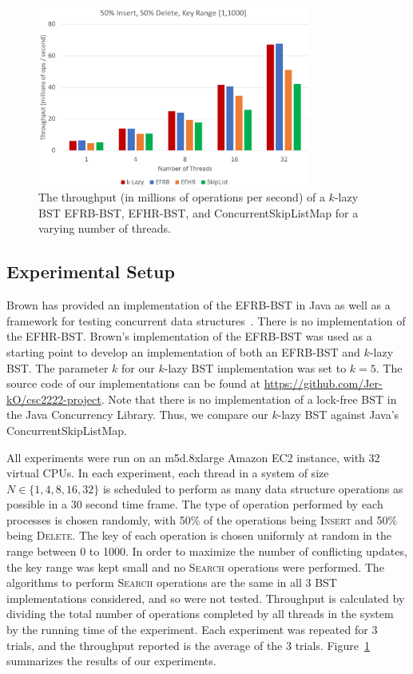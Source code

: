 \documentclass[letterpaper,twocolumn]{article}
\begin{document}
\begin{figure}[!tb]
	\centering
	\includegraphics[width=0.80\textwidth]{results.png} 
	\caption{The throughput (in millions of operations per second) of a $k$-lazy BST EFRB-BST, EFHR-BST, and ConcurrentSkipListMap for a varying number of threads.}
	\label{results}
\end{figure}


\subsection{Experimental Setup}
Brown has provided an implementation of the EFRB-BST in Java as well as a framework for testing concurrent data structures~\cite{BrownImpl19}. There is no implementation of the EFHR-BST. Brown's implementation of the EFRB-BST was used as a starting point to develop an implementation of both an EFRB-BST and $k$-lazy BST. The parameter $k$ for our $k$-lazy BST implementation was set to $k = 5$. The source code of our implementations can be found at \url{https://github.com/Jer-kO/csc2222-project}. Note that there is no implementation of a lock-free BST in the Java Concurrency Library. Thus, we compare our $k$-lazy BST against Java's ConcurrentSkipListMap.

All experiments were run on an m5d.8xlarge Amazon EC2 instance, with 32 virtual CPUs. In each experiment, each thread in a system of size $N \in  \{1, 4, 8, 16, 32\}$ is scheduled to perform as many data structure operations as possible in a 30 second time frame. The type of operation performed by each processes is chosen randomly, with 50\% of the operations being \textsc{Insert} and 50\% being \textsc{Delete}. The key of each operation is chosen uniformly at random in the range between 0 to 1000. In order to maximize the number of conflicting updates, the key range was kept small and no \textsc{Search} operations were performed. The algorithms to perform \textsc{Search} operations are the same in all 3 BST implementations considered, and so were not tested. Throughput is calculated by dividing the total number of operations completed by all threads in the system by the running time of the experiment. Each experiment was repeated for 3 trials, and the throughput reported is the average of the 3 trials. Figure~\ref{results} summarizes the results of our experiments.
\end{document}
